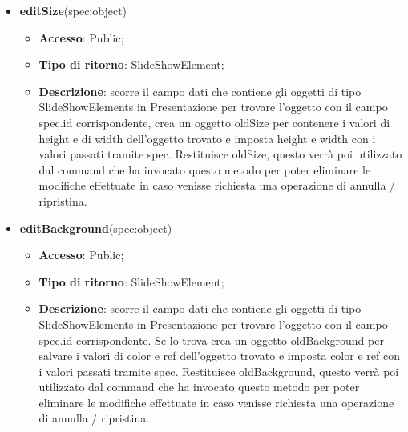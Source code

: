 {\begin{itemize}
\begin{itemize}
				\item \textbf{Tipo di ritorno}: SlideShowElement;
				\item \textbf{Descrizione}: scorre il campo dati che contiene gli oggetti di tipo SlideShowElements in Presentazione per trovare l’oggetto con il campo spec.id corrispondente, crea un oggetto oldRotation per contenere il valore di rotation dell’oggetto trovato e imposta rotation con il valore passato tramite spec. Restituisce oldRotation, questo verrà poi utilizzato dal command che ha invocato questo metodo per poter eliminare le modifiche effettuate in caso venisse richiesta una operazione di annulla / ripristina.
			\end{itemize}
			\item \textbf{editSize}(spec:object)
			\begin{itemize}
				\item \textbf{Accesso}: Public;
				\item \textbf{Tipo di ritorno}: SlideShowElement;
				\item \textbf{Descrizione}: scorre il campo dati che contiene gli oggetti di tipo SlideShowElements in Presentazione per trovare l’oggetto con il campo spec.id corrispondente, crea un oggetto oldSize per contenere i valori di height e di width dell’oggetto trovato e imposta height e width con i valori passati tramite spec. Restituisce oldSize, questo verrà poi utilizzato dal command che ha invocato questo metodo per poter eliminare le modifiche effettuate in caso venisse richiesta una operazione di annulla / ripristina.
			\end{itemize}
			\item \textbf{editBackground}(spec:object)
			\begin{itemize}
				\item \textbf{Accesso}: Public;
				\item \textbf{Tipo di ritorno}: SlideShowElement;
				\item \textbf{Descrizione}: scorre il campo dati che contiene gli oggetti di tipo SlideShowElements in Presentazione per trovare l’oggetto con il campo spec.id corrispondente. Se lo trova crea un oggetto oldBackground per salvare i valori di color e ref dell’oggetto trovato e imposta color e ref con i valori passati tramite spec. Restituisce oldBackground, questo verrà poi utilizzato dal command che ha invocato questo metodo per poter eliminare le modifiche effettuate in caso venisse richiesta una operazione di annulla / ripristina.
			\end{itemize}

\end{itemize}}
